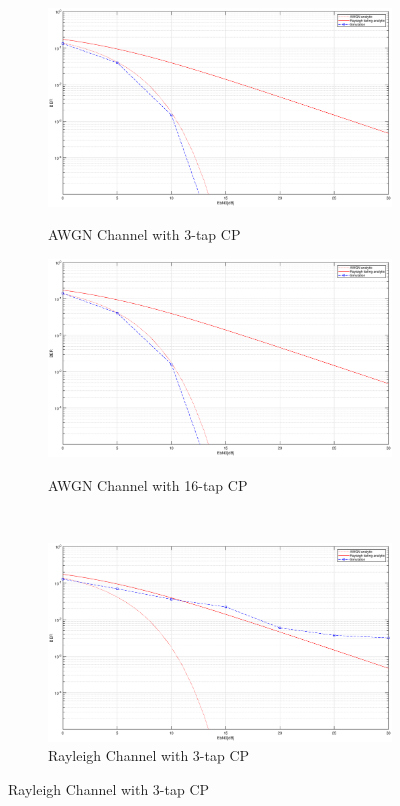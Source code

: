 \begin{figure}[!htbp]
    \centering
    \begin{subfigure}[t]{0.5\linewidth}
        \centering
        \caption{AWGN Channel with 3-tap CP}
        \includegraphics[width=\linewidth]{AWGN_3.eps}
        \label{fig:AWGN_3}
    \end{subfigure}%
    \begin{subfigure}[t]{0.5\linewidth}
        \centering
        \caption{AWGN Channel with 16-tap CP}
        \includegraphics[width=\linewidth]{AWGN_16.eps}
        \label{fig:AWGN_16}
    \end{subfigure}%
    \\ %
    \begin{subfigure}[t]{0.5\linewidth}
        \centering
        \caption{Rayleigh Channel with 3-tap CP}
        \includegraphics[width=\linewidth]{Rayleigh_3.eps}

\end{subfigure}
\end{figure}
